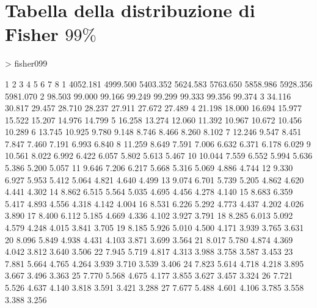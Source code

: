 \documentclass[onecolumn,12pt]{book}
\begin{document}
\section*{Tabella della distribuzione di Fisher $99\%$}
\oddsidemargin 0.0in
\evensidemargin 0.0in
\topmargin -0.4in
\begin{Schunk}
\begin{Sinput}
> fisher099
\end{Sinput}
\begin{Soutput}
           1        2        3        4        5        6        7        8
1   4052.181 4999.500 5403.352 5624.583 5763.650 5858.986 5928.356 5981.070
2     98.503   99.000   99.166   99.249   99.299   99.333   99.356   99.374
3     34.116   30.817   29.457   28.710   28.237   27.911   27.672   27.489
4     21.198   18.000   16.694   15.977   15.522   15.207   14.976   14.799
5     16.258   13.274   12.060   11.392   10.967   10.672   10.456   10.289
6     13.745   10.925    9.780    9.148    8.746    8.466    8.260    8.102
7     12.246    9.547    8.451    7.847    7.460    7.191    6.993    6.840
8     11.259    8.649    7.591    7.006    6.632    6.371    6.178    6.029
9     10.561    8.022    6.992    6.422    6.057    5.802    5.613    5.467
10    10.044    7.559    6.552    5.994    5.636    5.386    5.200    5.057
11     9.646    7.206    6.217    5.668    5.316    5.069    4.886    4.744
12     9.330    6.927    5.953    5.412    5.064    4.821    4.640    4.499
13     9.074    6.701    5.739    5.205    4.862    4.620    4.441    4.302
14     8.862    6.515    5.564    5.035    4.695    4.456    4.278    4.140
15     8.683    6.359    5.417    4.893    4.556    4.318    4.142    4.004
16     8.531    6.226    5.292    4.773    4.437    4.202    4.026    3.890
17     8.400    6.112    5.185    4.669    4.336    4.102    3.927    3.791
18     8.285    6.013    5.092    4.579    4.248    4.015    3.841    3.705
19     8.185    5.926    5.010    4.500    4.171    3.939    3.765    3.631
20     8.096    5.849    4.938    4.431    4.103    3.871    3.699    3.564
21     8.017    5.780    4.874    4.369    4.042    3.812    3.640    3.506
22     7.945    5.719    4.817    4.313    3.988    3.758    3.587    3.453
23     7.881    5.664    4.765    4.264    3.939    3.710    3.539    3.406
24     7.823    5.614    4.718    4.218    3.895    3.667    3.496    3.363
25     7.770    5.568    4.675    4.177    3.855    3.627    3.457    3.324
26     7.721    5.526    4.637    4.140    3.818    3.591    3.421    3.288
27     7.677    5.488    4.601    4.106    3.785    3.558    3.388    3.256

\end{Soutput}
\end{Schunk}
\end{document}
